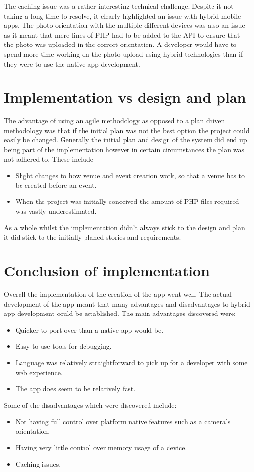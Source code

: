 The caching issue was a rather interesting technical challenge. Despite it not taking a long time to resolve, it clearly highlighted an issue with hybrid mobile apps. The photo orientation with the multiple different devices was also an issue as it meant that more lines of PHP had to be added to the API to ensure that the photo was uploaded in the correct orientation. A developer would have to spend more time working on the photo upload using hybrid technologies than if they were to use the native app development.

\section{Implementation vs design and plan}
The advantage of using an agile methodology as opposed to a plan driven methodology was that if the initial plan was not the best option the project could easily be changed. Generally the initial plan and design of the system did end up being part of the implementation however in certain circumstances the plan was not adhered to. These include 
\begin{itemize}
  \item Slight changes to how venue and event creation work, so that a venue has to be created before an event.
  \item When the project was initially conceived  the amount of PHP files required was vastly underestimated.
\end{itemize}
As a whole whilst the implementation didn't always stick to the design and plan it did stick to the initially planed stories and requirements.
\section{Conclusion of implementation}
Overall the implementation of the creation of the app went well. The actual development of the app meant that many advantages and disadvantages to hybrid app development could be established. The main advantages discovered were:
\begin{itemize}
\item Quicker to port over than a native app would be.
\item Easy to use tools for debugging.
\item Language was relatively straightforward to pick up for a developer with some web experience.
\item The app does seem to be relatively fast. 
\end{itemize}
Some of the disadvantages which were discovered include:
\begin{itemize}
\item Not having full control over platform native features such as a camera's orientation. 
\item Having very little control over memory usage of a device. 
\item Caching issues.
\end{itemize}


